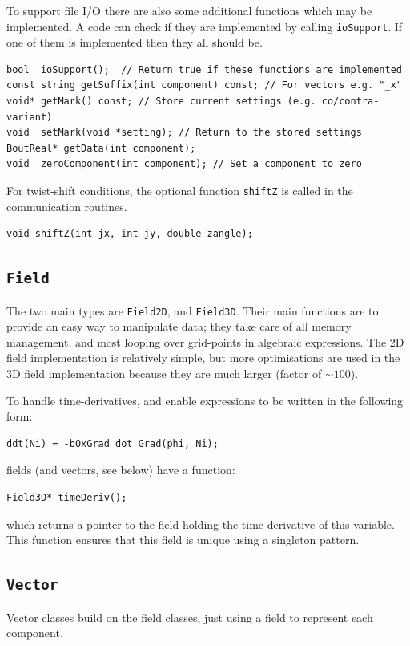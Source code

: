\documentclass[12pt]{article}
\newcommand{\code}[1]{\texttt{#1}}
\begin{document}
To support file I/O there are also some additional functions which may be implemented.
A code can check if they are implemented by calling \code{ioSupport}. If one of them
is implemented then they all should be.
\begin{lstlisting}
bool  ioSupport();  // Return true if these functions are implemented
const string getSuffix(int component) const; // For vectors e.g. "_x"
void* getMark() const; // Store current settings (e.g. co/contra-variant)
void  setMark(void *setting); // Return to the stored settings
BoutReal* getData(int component); 
void  zeroComponent(int component); // Set a component to zero
\end{lstlisting}  

For twist-shift conditions, the optional function \code{shiftZ} is called in the communication
routines.
\begin{lstlisting}
void shiftZ(int jx, int jy, double zangle);
\end{lstlisting}

\subsection{\code{Field}}
The two main types are \code{Field2D}, and \code{Field3D}. Their main functions
are to provide an easy way to manipulate data; they take care of all memory management,
and most looping over grid-points in algebraic expressions. The 2D field implementation
is relatively simple, but more optimisations are used in the 3D field implementation
because they are much larger (factor of $\sim 100$).

To handle time-derivatives, and enable expressions to be written in the
following form:
\begin{lstlisting}
ddt(Ni) = -b0xGrad_dot_Grad(phi, Ni);
\end{lstlisting}
fields (and vectors, see below) have a function:
\begin{lstlisting}
Field3D* timeDeriv();
\end{lstlisting}
which returns a pointer to the field holding the time-derivative
of this variable. This function ensures that this field is unique
using a singleton pattern.

\subsection{\code{Vector}}
Vector classes build on the field classes, just using a field to represent
each component. 
\end{document}

